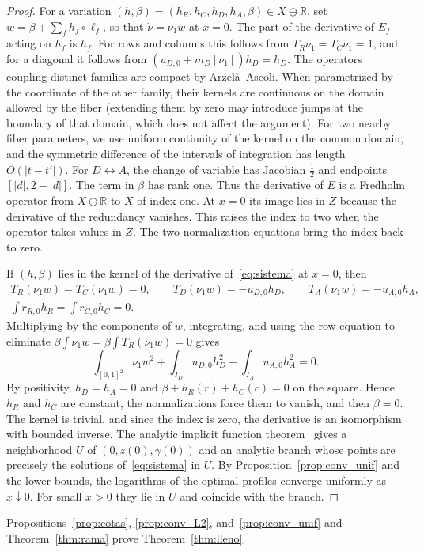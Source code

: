 \begin{proof} For a variation $(h,\beta)=(h_R,h_C,h_D,h_A,\beta)\in X\oplus\mathbb R$, set $w=\beta+\sum_fh_f\circ\ell_f$, so that
$\dot\nu=\nu_1w$ at $x=0$. The part of the derivative of $E_f$ acting on $h_f$ is $h_f$. For rows and columns this follows from
$T_R\nu_1=T_C\nu_1=1$, and for a diagonal it follows from $(u_{D,0}+m_D[\nu_1])h_D=h_D$. The operators coupling distinct families are
compact by Arzelà--Ascoli. When parametrized by the coordinate of the other family, their kernels are continuous on the domain allowed
by the fiber (extending them by zero may introduce jumps at the boundary of that domain, which does not affect the argument). For two
nearby fiber parameters, we use uniform continuity of the kernel on the common domain, and the symmetric difference of the intervals of
integration has length $O(|t-t'|)$. For $D\leftrightarrow A$, the change of variable has Jacobian $\frac12$ and endpoints
$[|d|,2-|d|]$. The term in $\beta$ has rank one. Thus the derivative of $E$ is a Fredholm operator from $X\oplus\mathbb R$ to $X$ of
index one. At $x=0$ its image lies in $Z$ because the derivative of the redundancy vanishes. This raises the index to two when the
operator takes values in $Z$. The two normalization equations bring the index back to zero.

If $(h,\beta)$ lies in the kernel of the derivative of~\eqref{eq:sistema} at $x=0$, then \begin{gather*}
 T_R(\nu_1w)=T_C(\nu_1w)=0,\qquad T_D(\nu_1w)=-u_{D,0}h_D,\qquad T_A(\nu_1w)=-u_{A,0}h_A,\\
 \int r_{R,0}h_R=\int r_{C,0}h_C=0 .
\end{gather*} Multiplying by the components of $w$, integrating, and using the row equation to eliminate $\beta\int\nu_1w=\beta\int
T_R(\nu_1w)=0$ gives \begin{equation}\label{eq:energia}
 \int_{[0,1]^2}\nu_1w^2+\int_{I_D}u_{D,0}h_D^2+\int_{I_A}u_{A,0}h_A^2=0 .
\end{equation} By positivity, $h_D=h_A=0$ and $\beta+h_R(r)+h_C(c)=0$ on the square. Hence $h_R$ and $h_C$ are constant, the
normalizations force them to vanish, and then $\beta=0$. The kernel is trivial, and since the index is zero, the derivative is an
isomorphism with bounded inverse. The analytic implicit function theorem~\cite{Zeidler} gives a neighborhood $U$ of
$(0,z(0),\gamma(0))$ and an analytic branch whose points are precisely the solutions of~\eqref{eq:sistema} in $U$. By
Proposition~\ref{prop:conv_unif} and the lower bounds, the logarithms of the optimal profiles converge uniformly as $x\downarrow0$. For
small $x>0$ they lie in $U$ and coincide with the branch. \end{proof}

Propositions~\ref{prop:cotas}, \ref{prop:conv_L2}, and~\ref{prop:conv_unif} and Theorem~\ref{thm:rama} prove Theorem~\ref{thm:lleno}.

